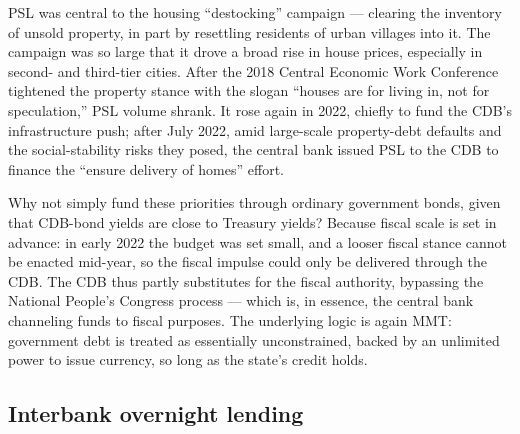 
\begin{remark}
PSL was central to the housing ``destocking'' campaign --- clearing the inventory of unsold property, in part by resettling residents of urban villages into it. The campaign was so large that it drove a broad rise in house prices, especially in second- and third-tier cities. After the 2018 Central Economic Work Conference tightened the property stance with the slogan ``houses are for living in, not for speculation,'' PSL volume shrank. It rose again in 2022, chiefly to fund the CDB's infrastructure push; after July 2022, amid large-scale property-debt defaults and the social-stability risks they posed, the central bank issued PSL to the CDB to finance the ``ensure delivery of homes'' effort.

Why not simply fund these priorities through ordinary government bonds, given that CDB-bond yields are close to Treasury yields? Because fiscal scale is set in advance: in early 2022 the budget was set small, and a looser fiscal stance cannot be enacted mid-year, so the fiscal impulse could only be delivered through the CDB. The CDB thus partly substitutes for the fiscal authority, bypassing the National People's Congress process --- which is, in essence, the central bank channeling funds to fiscal purposes. The underlying logic is again MMT: government debt is treated as essentially unconstrained, backed by an unlimited power to issue currency, so long as the state's credit holds.
\end{remark}


\subsection{Interbank overnight lending}

